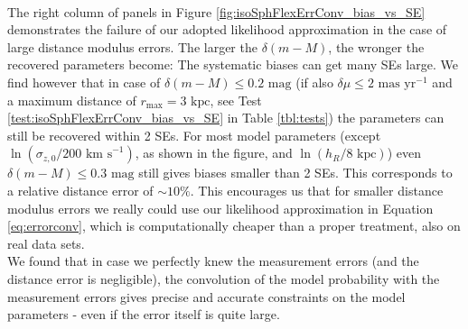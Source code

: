\\The right column of panels in Figure \ref{fig:isoSphFlexErrConv_bias_vs_SE} demonstrates the failure of our adopted likelihood approximation in the case of large distance modulus errors. The larger the $\delta(m-M)$, the wronger the recovered parameters become: The systematic biases can get many SEs large. We find however that in case of $\delta(m-M) \leq 0.2 \text{ mag}$ (if also $\delta \mu \leq 2 \text{ mas yr}^{-1}$ and a maximum distance of $r_\text{max} = 3 \text{ kpc}$, see Test \ref{test:isoSphFlexErrConv_bias_vs_SE} in Table \ref{tbl:tests}) the parameters can still be recovered within 2 SEs. For most model parameters (except $\ln(\sigma_{z,0} / 200\text{ km s}^{-1})$, as shown in the figure, and $\ln(h_R/ 8\text{ kpc})$) even $\delta(m-M) \leq 0.3 \text{ mag}$ still gives biases smaller than 2 SEs. This corresponds to a relative distance error of $\sim10\%$. This encourages us that for smaller distance modulus errors we really could use our likelihood approximation in Equation \ref{eq:errorconv}, which is computationally cheaper than a proper treatment, also on real data sets.\\

We found that in case we perfectly knew the measurement errors (and the distance error is negligible), the convolution of the model probability with the measurement errors gives precise and accurate constraints on the model parameters - even if the error itself is quite large. 



